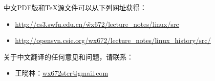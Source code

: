 \documentclass[12pt,a4paper]{article}
\begin{document}
  中文PDF版和\TeX{}源文件可以从下列网址获得：
\begin{itemize}
\item \href{http://cs3.swfu.edu.cn/~wx672/lecture_notes/linux/linux_history/src}{http://cs3.swfu.edu.cn/\~wx672/lecture\_notes/linux/src}
\item \href{http://opensvn.csie.org/wx672/lecture_notes/linux_history/src/}{http://opensvn.csie.org/wx672/lecture\_notes/linux\_history/src/}
\end{itemize}

  关于中文翻译的任何意见和问题，请联系：
\begin{itemize}
\item 王晓林：\href{mailto:wx672ster@gmail.com}{wx672ster@gmail.com}
\end{itemize}
\end{document}
